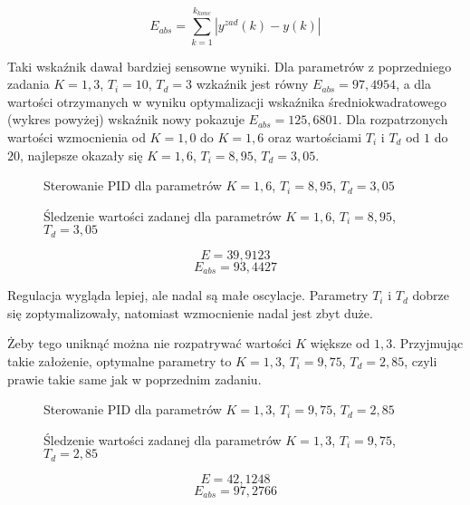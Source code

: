 \begin{equation}
E_{abs} = \sum_{k=1}^{k_{konc}} |y^{zad}(k) - y(k)|
\end{equation}

Taki wskaźnik dawał bardziej sensowne wyniki. Dla parametrów z poprzedniego zadania $K=1,3$, $T_i=10$, $T_d=3$ wzkaźnik jest równy $E_{abs} = 97,4954$, a dla wartości otrzymanych w wyniku optymalizacji wskaźnika średniokwadratowego (wykres powyżej) wskaźnik nowy pokazuje $E_{abs} = 125,6801$.
Dla rozpatrzonych wartości wzmocnienia od $K=1,0$ do $K=1,6$ oraz wartościami $T_i$ i $T_d$ od $1$ do $20$, najlepsze okazały się $K=1,6$, $T_i=8,95$, $T_d=3,05$.

\begin{figure}[H]
\centering

\caption{Sterowanie PID dla parametrów $K=1,6$, $T_i=8,95$,  $T_d=3,05$}
\end{figure}

\begin{figure}[H]
\centering

\caption{Śledzenie wartości zadanej dla parametrów $K=1,6$, $T_i=8,95$,  $T_d=3,05$}
\end{figure}

\begin{equation}
E = 39,9123 
\end{equation}
\begin{equation}
E_{abs} = 93,4427
\end{equation}

Regulacja wygląda lepiej, ale nadal są małe oscylacje. Parametry $T_i$ i $T_d$ dobrze się zoptymalizowały, natomiast wzmocnienie nadal jest zbyt duże.

Żeby tego uniknąć można nie rozpatrywać wartości $K$ większe od $1,3$. Przyjmując takie założenie, optymalne parametry to $K=1,3$, $T_i = 9,75$, $T_d=2,85$, czyli prawie takie same jak w poprzednim zadaniu.

\begin{figure}[H]
\centering

\caption{Sterowanie PID dla parametrów $K=1,3$, $T_i=9,75$,  $T_d=2,85$}
\end{figure}

\begin{figure}[H]
\centering

\caption{Śledzenie wartości zadanej dla parametrów $K=1,3$, $T_i=9,75$,  $T_d=2,85$}
\end{figure}

\begin{equation}
E = 42,1248
\end{equation}
\begin{equation}
E_{abs} = 97,2766
\end{equation}

